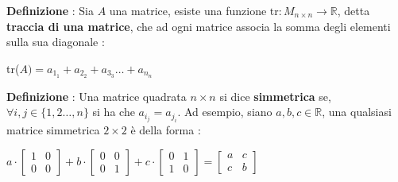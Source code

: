 \documentclass[12pt, letterpaper]{article}
\newcommand{\R}{{\mathbb R}}
\begin{document}
\textbf{Definizione }: Sia \(A\) una matrice, esiste una funzione \(\text{tr} : M_{n\times n}\rightarrow \R\),
detta \textbf{traccia di una matrice}, che 
ad ogni matrice associa la somma degli elementi sulla sua diagonale : \begin{center}
    tr(\(A)=a_{1_1}+a_{2_2}+a_{3_3}\dots+a_{n_n}\)
\end{center}
\textbf{Definizione} : Una matrice quadrata \(n\times n\) si dice \textbf{simmetrica} se, 
\(\forall i,j\in \{1,2\dots,n\}\) si ha che \(a_{i_j}=a_{j_i}\). Ad esempio, siano \(a,b,c\in \R\), una 
qualsiasi matrice simmetrica \(2\times 2\) è della forma :\begin{center}\(
    a\cdot \begin{bmatrix}
        1&0\\
        0&0 
    \end{bmatrix}+b\cdot   \begin{bmatrix}
        0&0\\
        0&1 
    \end{bmatrix} +c\cdot\begin{bmatrix}
        0&1\\
        1&0 
    \end{bmatrix}=\begin{bmatrix}
        a&c\\
        c&b 
    \end{bmatrix}
\)\end{center}
\end{document}

